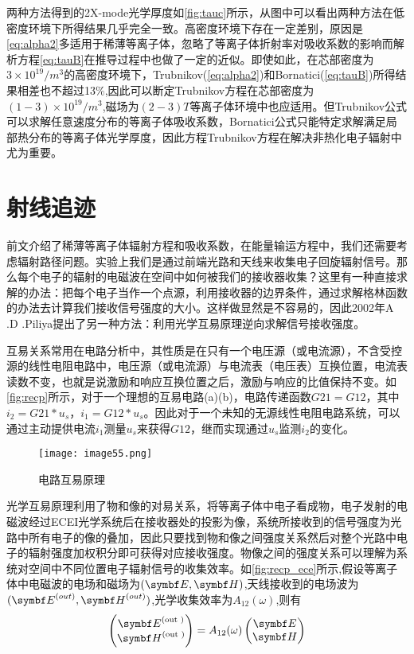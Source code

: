 \par 两种方法得到的2X-mode光学厚度如\autoref{fig:tauc}所示，从图中可以看出两种方法在低密度环境下所得结果几乎完全一致。高密度环境下存在一定差别，原因是\autoref{eq:alpha2}多适用于稀薄等离子体，忽略了等离子体折射率对吸收系数的影响而解析方程\autoref{eq:tauB}在推导过程中也做了一定的近似。即使如此，在芯部密度为$3\times10^{19}/m^3$的高密度环境下，Trubnikov(\autoref{eq:alpha2})和Bornatici(\autoref{eq:tauB})所得结果相差也不超过13\%,因此可以断定Trubnikov方程在芯部密度为$(1-3)\times10^{19}/m^3$,磁场为$(2-3)T$等离子体环境中也应适用。但Trubnikov公式可以求解任意速度分布的等离子体吸收系数，Bornatici公式只能特定求解满足局部热分布的等离子体光学厚度，因此方程Trubnikov方程在解决非热化电子辐射中尤为重要。
\section{射线追迹}
前文介绍了稀薄等离子体辐射方程和吸收系数，在能量输运方程中，我们还需要考虑辐射路径问题。实验上我们是通过前端光路和天线来收集电子回旋辐射信号。那么每个电子的辐射的电磁波在空间中如何被我们的接收器收集？这里有一种直接求解的办法：把每个电子当作一个点源，利用接收器的边界条件，通过求解格林函数的办法去计算我们接收信号强度的大小。这样做显然是不容易的，因此2002年A .D .Piliya提出了另一种方法：利用光学互易原理逆向求解信号接收强度\cite{RN1367}。\par
互易关系常用在电路分析中，其性质是在只有一个电压源（或电流源），不含受控源的线性电阻电路中，电压源（或电流源）与电流表（电压表）互换位置，电流表读数不变，也就是说激励和响应互换位置之后，激励与响应的比值保持不变。如\autoref{fig:recp}所示，对于一个理想的互易电路(a)(b)，电路传递函数$G21=G12$，其中$i_2=G21*u_s$，$i_1=G12*u_s$。因此对于一个未知的无源线性电阻电路系统，可以通过主动提供电流$i_1$测量$u_s$来获得$G12$，继而实现通过$u_s$监测$i_2$的变化。
\begin{figure}[ht]
\centering
\texttt{[image: image55.png]}
\caption{\label{fig:recp}电路互易原理}
\end{figure}
光学互易原理利用了物和像的对易关系，将等离子体中电子看成物，电子发射的电磁波经过ECEI光学系统后在接收器处的投影为像，系统所接收到的信号强度为光路中所有电子的像的叠加，因此只要找到物和像之间强度关系然后对整个光路中电子的辐射强度加权积分即可获得对应接收强度。物像之间的强度关系可以理解为系统对空间中不同位置电子辐射信号的收集效率。如\autoref{fig:recp_ece}所示,假设等离子体中电磁波的电场和磁场为$(\vE,\vH)$,天线接收到的电场波为$(\vE^{(out)},\vH^{(out)})$,光学收集效率为$A_{12}(\omega)$,则有
\begin{equation}
\left(\begin{matrix}
\vE^{(\text {out })} \\
\vH^{(\text {out })}
\end{matrix}\right)=A_{12}(\omega)\left(\begin{matrix}
\vE \\
\vH
\end{matrix}\right)
\end{equation}
